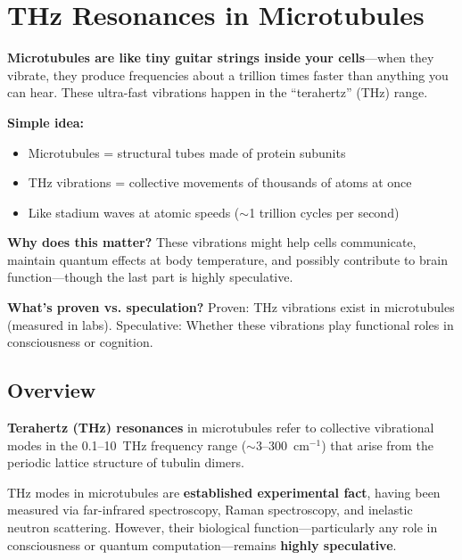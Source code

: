 \chapter{THz Resonances in Microtubules}
\label{ch:thz-resonances-microtubules}

\begin{nontechnical}
\textbf{Microtubules are like tiny guitar strings inside your cells}---when they vibrate, they produce frequencies about a trillion times faster than anything you can hear. These ultra-fast vibrations happen in the ``terahertz'' (THz) range.

\textbf{Simple idea:}
\begin{itemize}
\item Microtubules = structural tubes made of protein subunits
\item THz vibrations = collective movements of thousands of atoms at once
\item Like stadium waves at atomic speeds ($\sim$1 trillion cycles per second)
\end{itemize}

\textbf{Why does this matter?} These vibrations might help cells communicate, maintain quantum effects at body temperature, and possibly contribute to brain function---though the last part is highly speculative.

\textbf{What's proven vs. speculation?} Proven: THz vibrations exist in microtubules (measured in labs). Speculative: Whether these vibrations play functional roles in consciousness or cognition.
\end{nontechnical}

\section{Overview}

\textbf{Terahertz (THz) resonances} in microtubules refer to collective vibrational modes in the 0.1--10~THz frequency range ($\sim$3--300~cm$^{-1}$) that arise from the periodic lattice structure of tubulin dimers.

\begin{keyconcept}
THz modes in microtubules are \textbf{established experimental fact}, having been measured via far-infrared spectroscopy, Raman spectroscopy, and inelastic neutron scattering. However, their biological function---particularly any role in consciousness or quantum computation---remains \textbf{highly speculative}.
\end{keyconcept}

